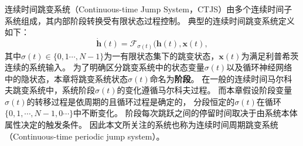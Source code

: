连续时间跳变系统（Continuous-time Jump System，CTJS）由多个连续时间子系统组成，其内部阶段转换受有限状态过程控制\cite{8709809}。
典型的连续时间跳变系统定义如下：
\begin{equation}
    \dot{\boldsymbol h}(t)=\mathcal{F}_{\sigma(t)}(\boldsymbol h(t), \boldsymbol x(t),
    \label{equ:ctjls}
\end{equation}
其中$\sigma(t)\in\{0,1\cdots,N-1\}$为一有限状态集下的跳变状态，$\boldsymbol{x}(t)$为满足利普希茨连续的系统输入。
为了明确区分跳变系统中的状态变量$\sigma(t)$以及循环神经网络中的隐状态，本章将跳变系统状态$\sigma(t)$命名为\textbf{阶段}。
在一般的连续时间马尔科夫跳变系统中，系统阶段$\sigma(t)$的变化遵循马尔科夫过程。
而本章假设阶段变量$\sigma(t)$的转移过程是依周期的且循环过程是确定的，
分段恒定的$\sigma(t)$在循环$\{0,1,\cdots,N-1,0 \cdots\}$中不断变化。
阶段每次跳跃之间的停留时间取决于由系统本体属性决定的触发条件。
因此本文所关注的系统也称为连续时间周期跳变系统（Continuous-time periodic jump system）。

